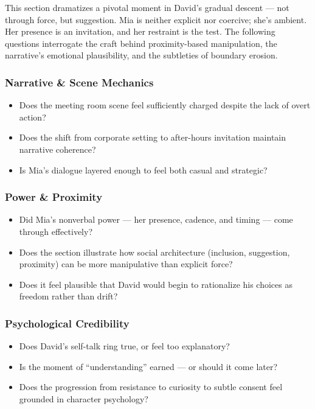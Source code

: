 This section dramatizes a pivotal moment in David’s gradual descent — not through force, but suggestion. Mia is neither explicit nor coercive; she’s ambient. Her presence is an invitation, and her restraint is the test. The following questions interrogate the craft behind proximity-based manipulation, the narrative’s emotional plausibility, and the subtleties of boundary erosion.

\subsubsection*{Narrative \& Scene Mechanics}

\begin{itemize}
  \item Does the meeting room scene feel sufficiently charged despite the lack of overt action?
  \item Does the shift from corporate setting to after-hours invitation maintain narrative coherence?
  \item Is Mia’s dialogue layered enough to feel both casual and strategic?
\end{itemize}

\subsubsection*{Power \& Proximity}

\begin{itemize}
  \item Did Mia’s nonverbal power — her presence, cadence, and timing — come through effectively?
  \item Does the section illustrate how social architecture (inclusion, suggestion, proximity) can be more manipulative than explicit force?
  \item Does it feel plausible that David would begin to rationalize his choices as freedom rather than drift?
\end{itemize}

\subsubsection*{Psychological Credibility}

\begin{itemize}
  \item Does David’s self-talk ring true, or feel too explanatory?
  \item Is the moment of “understanding” earned — or should it come later?
  \item Does the progression from resistance to curiosity to subtle consent feel grounded in character psychology?
\end{itemize}


